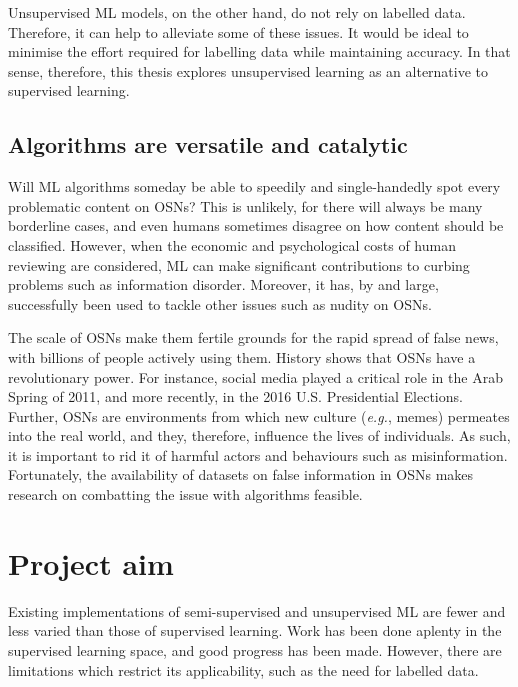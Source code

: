Unsupervised \ac{ML} models, on the other hand, do not rely on labelled data. Therefore, it can help to alleviate some of these issues. It would be ideal to minimise the effort required for labelling data while maintaining accuracy. In that sense, therefore, this thesis explores unsupervised learning as an alternative to supervised learning. 

\subsection{Algorithms are versatile and catalytic}
\label{ssec:1-algo}

Will \ac{ML} algorithms someday be able to speedily and single-handedly spot every problematic content on \acp{OSN}? This is unlikely, for there will always be many borderline cases, and even humans sometimes disagree on how content should be classified. However, when the economic and psychological costs of human reviewing are considered, \ac{ML} can make significant contributions to curbing problems such as information disorder. Moreover, it has, by and large, successfully been used to tackle other issues such as nudity on \acp{OSN}.

The scale of \acp{OSN} make them fertile grounds for the rapid spread of false news, with billions of people actively using them. History shows that \acp{OSN} have a revolutionary power. For instance, social media played a critical role in the Arab Spring of 2011, and more recently, in the 2016 U.S. Presidential Elections. Further, \acp{OSN} are environments from which new culture (\emph{e.g.}, memes) permeates into the real world, and they, therefore, influence the lives of individuals. As such, it is important to rid it of harmful actors and behaviours such as misinformation. Fortunately, the availability of datasets on false information in \acp{OSN} makes research on combatting the issue with algorithms feasible.

\section{Project aim}
\label{ssec:1-aim}

Existing implementations of semi-supervised and unsupervised \ac{ML} are fewer and less varied than those of supervised learning. Work has been done aplenty in the supervised learning space, and good progress has been made. However, there are limitations which restrict its applicability, such as the need for labelled data.

